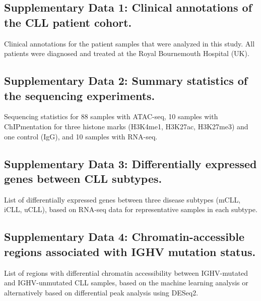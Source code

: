 \documentclass[10pt,]{article}
\begin{document}
\subsection{Supplementary Data 1: Clinical annotations of the CLL
patient
cohort.}\label{supplementary-data-1-clinical-annotations-of-the-cll-patient-cohort.}

Clinical annotations for the patient samples that were analyzed in this
study. All patients were diagnosed and treated at the Royal Bournemouth
Hospital (UK).

\subsection{Supplementary Data 2: Summary statistics of the sequencing
experiments.}\label{supplementary-data-2-summary-statistics-of-the-sequencing-experiments.}

Sequencing statistics for 88 samples with ATAC-seq, 10 samples with
ChIPmentation for three histone marks (H3K4me1, H3K27ac, H3K27me3) and
one control (IgG), and 10 samples with RNA-seq.

\subsection{Supplementary Data 3: Differentially expressed genes between
CLL
subtypes.}\label{supplementary-data-3-differentially-expressed-genes-between-cll-subtypes.}

List of differentially expressed genes between three disease subtypes
(mCLL, iCLL, uCLL), based on RNA-seq data for representative samples in
each subtype.

\subsection{Supplementary Data 4: Chromatin-accessible regions
associated with IGHV mutation
status.}\label{supplementary-data-4-chromatin-accessible-regions-associated-with-ighv-mutation-status.}

List of regions with differential chromatin accessibility between
IGHV-mutated and IGHV-unmutated CLL samples, based on the machine
learning analysis or alternatively based on differential peak analysis
using DESeq2.
\end{document}

